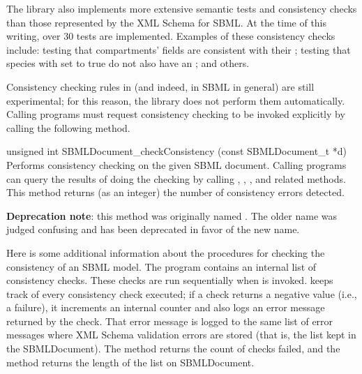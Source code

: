 \documentclass{sbmlmanual}
\begin{document}
The \libsbml{} library also implements more extensive semantic tests and
consistency checks than those represented by the XML Schema for SBML.  At
the time of this writing, over 30 tests are implemented.  Examples of these
consistency checks include: testing that compartments'
 fields are consistent with their
; testing that species with
 set to true do not also have an
; and others.
    
Consistency checking rules in \libsbml{} (and indeed, in SBML in general)
are still experimental; for this reason, the library does not perform them
automatically.  Calling programs must request consistency checking to be
invoked explicitly by calling the following method.

\begin{methoddef}{unsigned int SBMLDocument\_checkConsistency (const SBMLDocument\_t *d)}
  Performs consistency checking on the given SBML document.  Calling
  programs can query the results of doing the checking by calling 
  ,
  ,
  , and related methods.  This method
  returns (as an integer) the number of consistency errors detected.

  \textbf{Deprecation note}: this method was originally named
  .  The older name was judged confusing
  and has been deprecated in favor of the new name.
\end{methoddef}

Here is some additional information about the \libsbml{} procedures for
checking the consistency of an SBML model.  The program contains an
internal list of consistency checks.  These checks are run sequentially
when  is invoked.  \libsbml{}
keeps track of every consistency check executed; if a check returns a
negative value (i.e., a failure), it increments an internal counter and
also logs an error message returned by the check.  That error message is
logged to the same list of error messages where XML Schema validation
errors are stored (that is, the list kept in the SBMLDocument).  The method
 returns the count of checks
failed, and the method  returns the
length of the list on SBMLDocument.


\end{document}
